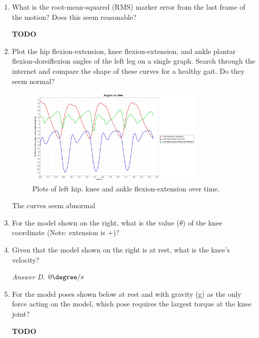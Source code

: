 \documentclass[11pt]{article}
\begin{document}
\begin{enumerate}
    \begin{adjustwidth}{0.5cm}{}
        \textit{4. All of the above}
    \end{adjustwidth}
    \item What is the root-mean-squared (RMS) marker error from the last frame of the motion? Does this seem reasonable?
    \begin{adjustwidth}{0.5cm}{}
        \textbf{TODO}
    \end{adjustwidth}
    \item Plot the hip flexion-extension, knee flexion-extension, and ankle plantar flexion-dorsiflexion angles of the left leg on a single graph. Search through the internet and compare the shape of these curves for a healthy gait. Do they seem normal?
    \begin{adjustwidth}{0.5cm}{}
        \begin{figure}[h!]
            \centering
            \includegraphics[width=0.8\textwidth]{screens/flexion_extension.jpg}
            \caption{Plots of left hip, knee and ankle flexion-extension over time.}
        \end{figure}
        The curves seem abnormal
    \end{adjustwidth}
    \item For the model shown on the right, what is the value ($\theta$) of the knee coordinate (Note: extension is +)?
    \item Given that the model shown on the right is at rest, what is the knee's velocity?
    \begin{adjustwidth}{0.5cm}{}
        \textit{Answer D. $0 \degree / s$}
    \end{adjustwidth}
    \item For the model poses shown below at rest and with gravity (g) as the only force acting on the model, which pose requires the largest torque at the knee joint?
    \begin{adjustwidth}{0.5cm}{}
        \textbf{TODO}

\end{adjustwidth}
\end{enumerate}
\end{document}
